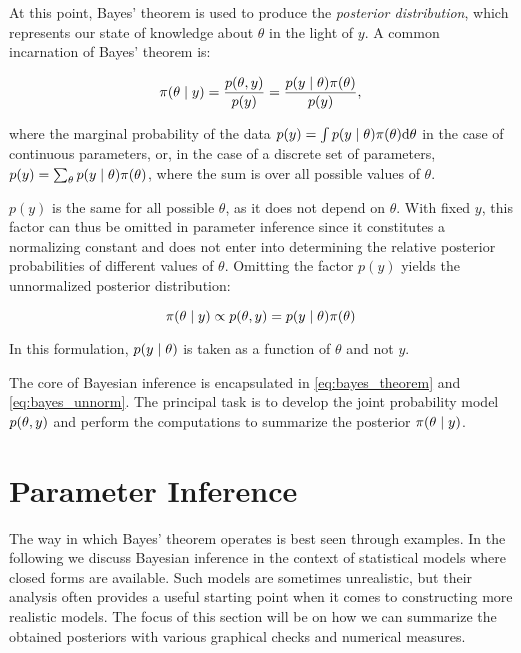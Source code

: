 At this point, Bayes' theorem is used to produce the \textit{posterior distribution}, which represents our state of knowledge about $\theta$ in the light of $y$. A common incarnation of Bayes' theorem is:

\begin{equation}\label{eq:bayes_theorem}
    \pi \qty(\theta \mid y) = \frac{p(\theta, y)}{p(y)}  = \frac{p \qty(y \mid \theta) \pi \qty(\theta)}{p(y)},
\end{equation}

where the marginal probability of the data $p(y) = \int p \qty(y \mid \theta) \pi \qty(\theta) \dd \theta$ in the case of continuous parameters, or, in the case of a discrete set of parameters, $p(y) = \sum_\theta p \qty(y \mid \theta) \pi \qty(\theta)$, where the sum is over all possible values of $\theta$.

$p(y)$ is the same for all possible $\theta$, as it does not depend on $\theta$. With fixed $y$, this factor can thus be omitted in parameter inference since it constitutes a normalizing constant and does not enter into determining the relative posterior probabilities of different values of $\theta$. Omitting the factor $p(y)$ yields the unnormalized posterior distribution: 

\begin{equation}\label{eq:bayes_unnorm}
    \pi \qty(\theta \mid y) \propto p(\theta, y) =  p \qty(y \mid \theta) \pi \qty(\theta) 
\end{equation}

In this formulation, $p \qty(y \mid \theta)$ is taken as a function of $\theta$ and not $y$.  

The core of Bayesian inference is encapsulated in \autoref{eq:bayes_theorem} and \autoref{eq:bayes_unnorm}. The principal task is to develop the joint probability model $p(\theta, y)$ and perform the computations to summarize the posterior $\pi \qty(\theta \mid y)$.


\section{Parameter Inference}\label{sec:param_inference}

The way in which Bayes' theorem operates is best seen through examples. In the following we discuss Bayesian inference in the context of statistical models where closed forms are available. Such models are sometimes unrealistic, but their analysis often provides a useful starting point when it comes to constructing more realistic models. The focus of this section will be on how we can summarize the obtained posteriors with various graphical checks and numerical measures. 

